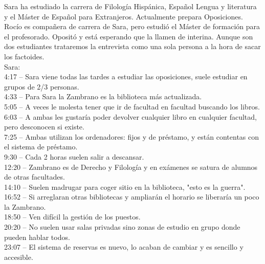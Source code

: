 \documentclass[12pt]{article}
\begin{document}
Sara ha estudiado la carrera de Filología Hispánica, Español Lengua y literatura y el Máster de Español para Extranjeros. Actualmente prepara Oposiciones. Rocío es compañera de carrera de Sara, pero estudió el Máster de formación para el profesorado. Opositó y está esperando que la llamen de interina. Aunque son dos estudiantes trataremos la entrevista como una sola persona a la hora de sacar los factoides. \\

Sara: \\
4:17 – Sara viene todas las tardes a estudiar las oposiciones, suele estudiar en grupos de 2/3 personas.\\
4:33 – Para Sara la Zambrano es la biblioteca más actualizada.\\
5:05 – A veces le molesta tener que ir de facultad en facultad buscando los libros.\\
6:03 – A ambas les gustaría poder devolver cualquier libro en cualquier facultad, pero desconocen si existe.\\
7:25 – Ambas utilizan los ordenadores: fijos y de préstamo, y están contentas con el sistema de préstamo.\\
9:30 – Cada 2 horas suelen salir a descansar.\\
12:20 – Zambrano es de Derecho y Filología y en exámenes se satura de alumnos de otras facultades.\\
14:10 – Suelen madrugar para coger sitio en la biblioteca, "esto es la guerra".\\
16:52 – Si arreglaran otras bibliotecas y ampliarán el horario se liberaría un poco la Zambrano.\\
18:50 – Ven difícil la gestión de los puestos.\\
20:20 – No suelen usar salas privadas sino zonas de estudio en grupo donde pueden hablar todos.\\
23:07 – El sistema de reservas es nuevo, lo acaban de cambiar y es sencillo y accesible.\\
\end{document}
